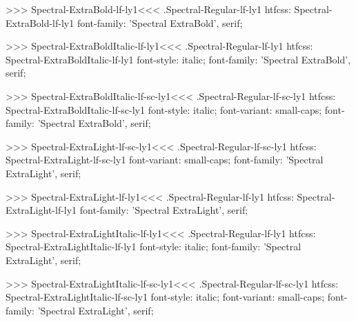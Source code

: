 >>>
\<Spectral-ExtraBold-lf-ly1\><<<
.Spectral-Regular-lf-ly1
htfcss:  Spectral-ExtraBold-lf-ly1  font-family: 'Spectral ExtraBold', serif;

>>>
\<Spectral-ExtraBoldItalic-lf-ly1\><<<
.Spectral-Regular-lf-ly1
htfcss:  Spectral-ExtraBoldItalic-lf-ly1  font-style: italic; font-family: 'Spectral ExtraBold', serif;

>>>
\<Spectral-ExtraBoldItalic-lf-sc-ly1\><<<
.Spectral-Regular-lf-sc-ly1
htfcss:  Spectral-ExtraBoldItalic-lf-sc-ly1  font-style: italic; font-variant: small-caps; font-family: 'Spectral ExtraBold', serif;

>>>
\<Spectral-ExtraLight-lf-sc-ly1\><<<
.Spectral-Regular-lf-sc-ly1
htfcss:  Spectral-ExtraLight-lf-sc-ly1  font-variant: small-caps; font-family: 'Spectral ExtraLight', serif;

>>>
\<Spectral-ExtraLight-lf-ly1\><<<
.Spectral-Regular-lf-ly1
htfcss:  Spectral-ExtraLight-lf-ly1  font-family: 'Spectral ExtraLight', serif;

>>>
\<Spectral-ExtraLightItalic-lf-ly1\><<<
.Spectral-Regular-lf-ly1
htfcss:  Spectral-ExtraLightItalic-lf-ly1  font-style: italic; font-family: 'Spectral ExtraLight', serif;

>>>
\<Spectral-ExtraLightItalic-lf-sc-ly1\><<<
.Spectral-Regular-lf-sc-ly1
htfcss:  Spectral-ExtraLightItalic-lf-sc-ly1  font-style: italic; font-variant: small-caps; font-family: 'Spectral ExtraLight', serif;

